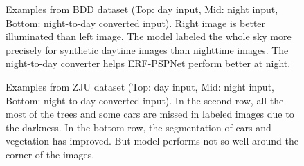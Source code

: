 \documentclass[a4paper]{spie}
\begin{document}
\begin{figure}[ht]
   \centering  {}
   
   \caption[BDD-GAN]
   { \label{fig:BDD-GAN} 
   Examples from BDD dataset (Top: day input, Mid: night input, Bottom: night-to-day converted input). Right image is better illuminated than left image. The model labeled the whole sky more precisely for synthetic daytime images than nighttime images. The night-to-day converter helps ERF-PSPNet perform better at night.}
\end{figure}

\begin{figure}[ht]
   \centering  {}
   
   \caption[ZJU-GAN]
   { \label{fig:ZJU-GAN} 
   Examples from ZJU dataset (Top: day input, Mid: night input, Bottom: night-to-day converted input). In the second row, all the most of the trees and some cars are missed in labeled images due to the darkness. In the bottom row, the segmentation of cars and vegetation has improved. But model performs not so well around the corner of the images.}
\end{figure}
\end{document}
